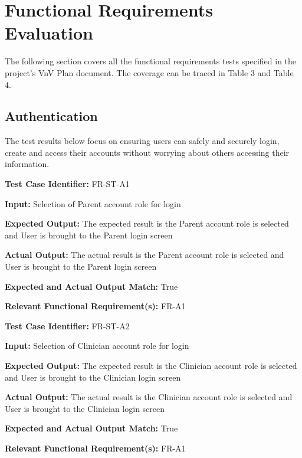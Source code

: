 \documentclass[12pt, titlepage]{article}
\begin{document}
\section{Functional Requirements Evaluation}
\hspace{2em}The following section covers all the functional requirements tests specified in the project's
VnV Plan document. The coverage can be traced in Table 3 and Table 4.

\subsection{Authentication}
\hspace{2em}The test results below focus on ensuring users can safely and securely login, create and
access their accounts without worrying about others accessing their information.

\begin{mdframed}[linewidth=0.5mm] \par
  \textbf{Test Case Identifier:} FR-ST-A1 \par
  \textbf{Input:} Selection of Parent account role for login \par
  \textbf{Expected Output:} The expected result is the Parent account role is selected and User is brought to the Parent login screen \par
  \textbf{Actual Output:} The actual result is the Parent account role is selected and User is brought to the Parent login screen \par
  \textbf{Expected and Actual Output Match:} True \par
  \textbf{Relevant Functional Requirement(s):} FR-A1
\end{mdframed}

\begin{mdframed}[linewidth=0.5mm] \par
  \textbf{Test Case Identifier:} FR-ST-A2 \par
  \textbf{Input:} Selection of Clinician account role for login \par
  \textbf{Expected Output:} The expected result is the Clinician account role is selected and User is brought to the Clinician login screen \par
  \textbf{Actual Output:} The actual result is the Clinician account role is selected and User is brought to the Clinician login screen \par
  \textbf{Expected and Actual Output Match:} True \par
  \textbf{Relevant Functional Requirement(s):} FR-A1
\end{mdframed}
\end{document}
